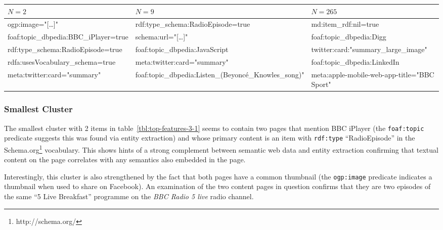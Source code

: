 \begin{sidewaystable}[p]
  \centering
  \begin{tabular}{|l|l|l|}
    $N=2$                                 & $N=9$                                                   & $N=265$                                     \\
    \hline
    ogp:image="[\ldots]"                  & rdf:type\_schema:RadioEpisode=true                      & md:item\_rdf:nil=true                       \\
    foaf:topic\_dbpedia:BBC\_iPlayer=true & schema:url="[\ldots]"                                   & foaf:topic\_dbpedia:Digg                    \\
    rdf:type\_schema:RadioEpisode=true    & foaf:topic\_dbpedia:JavaScript                          & twitter:card:"summary\_large\_image"        \\
    rdfa:usesVocabulary\_schema=true      & meta:twitter:card="summary"                             & foaf:topic\_dbpedia:LinkedIn                \\
    meta:twitter:card="summary"           & foaf:topic\_dbpedia:Listen\_(Beyonc\'e\_Knowles\_song)" & meta:apple-mobile-web-app-title="BBC Sport" \\
  \end{tabular}
  \caption{Ten most common features across the smallest, the largest and a mean-sized cluster produced by the enriched union of dereference and entity extraction}
  \label{tbl:top-features-3-1}
\end{sidewaystable}

\subsubsection{Smallest Cluster}

The smallest cluster with 2 items in table~\ref{tbl:top-features-3-1}
seems to contain two pages that mention BBC iPlayer (the
\texttt{foaf:topic} predicate suggests this was found via entity
extraction) and whose primary content is an item with \texttt{rdf:type}
``RadioEpisode'' in the Schema.org\footnote{http://schema.org/}
vocabulary. This shows hints of a strong complement between semantic
web data and entity extraction confirming that textual content on the
page correlates with any semantics also embedded in the page.

Interestingly, this cluster is also strengthened by the fact that
both pages have a common thumbnail (the \texttt{ogp:image} predicate
indicates a thumbnail when used to share on Facebook). An examination
of the two content pages in question confirms that they are two
episodes of the same ``5 Live Breakfast'' programme on the
\emph{BBC Radio 5 live} radio channel.

